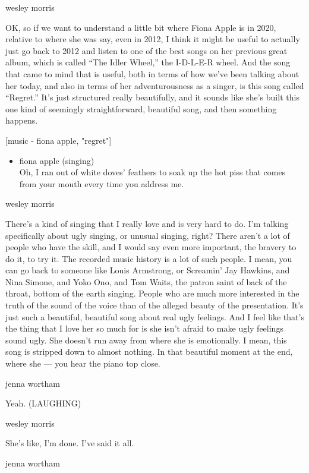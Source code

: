 wesley morris

OK, so if we want to understand a little bit where Fiona Apple is in
2020, relative to where she was say, even in 2012, I think it might be
useful to actually just go back to 2012 and listen to one of the best
songs on her previous great album, which is called ``The Idler Wheel,''
the I-D-L-E-R wheel. And the song that came to mind that is useful, both
in terms of how we've been talking about her today, and also in terms of
her adventurousness as a singer, is this song called ``Regret.'' It's
just structured really beautifully, and it sounds like she's built this
one kind of seemingly straightforward, beautiful song, and then
something happens.

{[}music - fiona apple, "regret"{]}

\begin{itemize}
\tightlist
\item
  fiona apple (singing)\\
  Oh, I ran out of white doves' feathers to soak up the hot piss that
  comes from your mouth every time you address me.
\end{itemize}

wesley morris

There's a kind of singing that I really love and is very hard to do. I'm
talking specifically about ugly singing, or unusual singing, right?
There aren't a lot of people who have the skill, and I would say even
more important, the bravery to do it, to try it. The recorded music
history is a lot of such people. I mean, you can go back to someone like
Louis Armstrong, or Screamin' Jay Hawkins, and Nina Simone, and Yoko
Ono, and Tom Waits, the patron saint of back of the throat, bottom of
the earth singing. People who are much more interested in the truth of
the sound of the voice than of the alleged beauty of the presentation.
It's just such a beautiful, beautiful song about real ugly feelings. And
I feel like that's the thing that I love her so much for is she isn't
afraid to make ugly feelings sound ugly. She doesn't run away from where
she is emotionally. I mean, this song is stripped down to almost
nothing. In that beautiful moment at the end, where she --- you hear the
piano top close.

jenna wortham

Yeah. (LAUGHING)

wesley morris

She's like, I'm done. I've said it all.

jenna wortham

